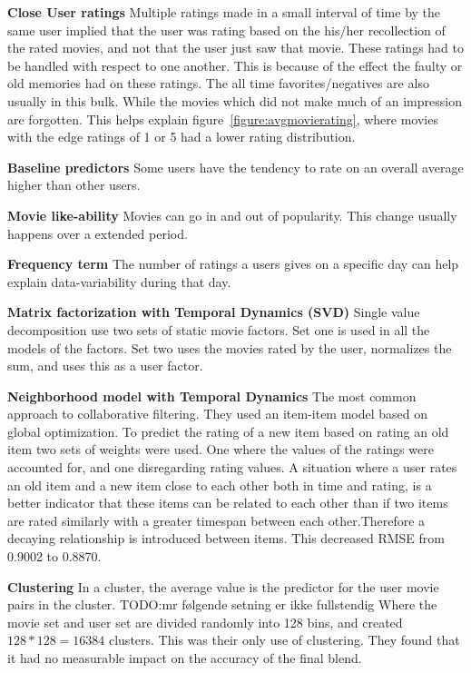 \textbf{Close User ratings} Multiple ratings made in a small interval of time by the same user implied that the user was rating based on the his/her recollection of the rated movies, and not that the user just saw that movie. These ratings had to be handled with respect to one another. This is because of the effect the faulty or old memories had on these ratings. The all time favorites/negatives are also usually in this bulk. While the movies which did not make much of an impression are forgotten. This helps explain figure~\ref{figure:avgmovierating}, where movies with the edge ratings of 1 or 5 had a lower rating distribution.

\textbf{Baseline predictors}  Some users have the tendency to rate on an overall average higher than other users.

\textbf{Movie like-ability}  Movies can go in and out of popularity. This change usually happens over a extended period.

\textbf{Frequency term}  The number of ratings a users gives on a specific day can help explain data-variability during that day.

\textbf{Matrix factorization with Temporal Dynamics (SVD)}  Single value decomposition use two sets of static movie factors. Set one is used in all the models of the factors. Set two uses the movies rated by the user, normalizes the sum, and uses this as a user factor.

\textbf{Neighborhood model with Temporal Dynamics}  The most common approach to collaborative filtering. They used an item-item model based on global optimization. To predict the rating of a new item based on rating an old item two sets of weights were used. One where the values of the ratings were accounted for, and one disregarding rating values.
A situation where a user rates an old item and a new item close to each other both in time and rating, is a better indicator that these items can be related to each other than if two items are rated similarly with a greater timespan between each other.Therefore a decaying relationship is introduced between items. This decreased RMSE from 0.9002 to 0.8870.\cite{BellKor-CF-TD}

\textbf{Clustering}  In a cluster, the average value is the predictor for the user movie pairs in the cluster.
TODO:mr følgende setning er ikke fullstendig
Where the movie set and user set are divided randomly into 128 bins, and created $128*128=16384$ clusters. This was their only use of clustering.
They found that it had no measurable impact on the accuracy of the final blend\cite{pragmatictheory-sol}.

